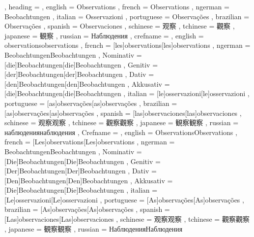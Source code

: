   {
    , heading =   {
                    , english     = Observations
                    , french      = Observations
                    , ngerman     = Beobachtungen
                    , italian     = Osservazioni
                    , portuguese  = Observações
                    , brazilian   = Observações
                    , spanish     = Observaciones
                    , schinese    = 观察
                    , tchinese    = 觀察
                    , japanese    = 観察
                    , russian     = Наблюдения
                  }
    , crefname =  {
                    , english     = {observations}{observations}
                    , french      = [les]{observations}[les]{observations}
                    , ngerman     = { {Beobachtungen}{Beobachtungen}
                                      , Nominativ = [die]{Beobachtungen}[die]{Beobachtungen}
                                      , Genitiv   = [der]{Beobachtungen}[der]{Beobachtungen}
                                      , Dativ     = [den]{Beobachtungen}[den]{Beobachtungen}
                                      , Akkusativ = [die]{Beobachtungen}[die]{Beobachtungen}
                                    }
                    , italian     = [le]{osservazioni}[le]{osservazioni}
                    , portuguese  = [as]{observações}[as]{observações}
                    , brazilian   = [as]{observações}[as]{observações}
                    , spanish     = [las]{observaciones}[las]{observaciones}
                    , schinese    = {观察}{观察}
                    , tchinese    = {觀察}{觀察}
                    , japanese    = {観察}{観察}
                    , russian     = {наблюдения}{наблюдения}
                  }
    , Crefname =  {
                    , english     = {Observations}{Observations}
                    , french      = [Les]{observations}[Les]{observations}
                    , ngerman     = { {Beobachtungen}{Beobachtungen}
                                      , Nominativ = [Die]{Beobachtungen}[Die]{Beobachtungen}
                                      , Genitiv   = [Der]{Beobachtungen}[Der]{Beobachtungen}
                                      , Dativ     = [Den]{Beobachtungen}[Den]{Beobachtungen}
                                      , Akkusativ = [Die]{Beobachtungen}[Die]{Beobachtungen}
                                    }
                    , italian     = [Le]{osservazioni}[Le]{osservazioni}
                    , portuguese  = [As]{observações}[As]{observações}
                    , brazilian   = [As]{observações}[As]{observações}
                    , spanish     = [Las]{observaciones}[Las]{observaciones}
                    , schinese    = {观察}{观察}
                    , tchinese    = {觀察}{觀察}
                    , japanese    = {観察}{観察}
                    , russian     = {Наблюдения}{Наблюдения}
                  }
  }

